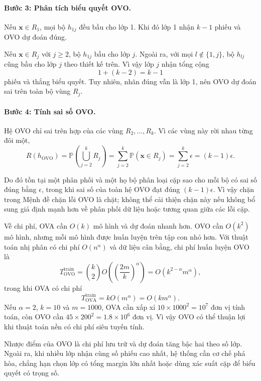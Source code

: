 \begin{expandbox}
\paragraph{Bước 3: Phân tích biểu quyết OVO.}
Nếu $\bm{x}\in R_1$, mọi bộ $h_{1j}$ đều bầu cho lớp 1. Khi đó lớp 1 nhận $k-1$ phiếu và OVO dự đoán đúng.

Nếu $\bm{x}\in R_j$ với $j\geq 2$, bộ $h_{1j}$ bầu cho lớp $j$. Ngoài ra, với mọi $l\notin\{1,j\}$, bộ $h_{lj}$ cũng bầu cho lớp $j$ theo thiết kế trên. Vì vậy lớp $j$ nhận tổng cộng
\[
  1+(k-2)=k-1
\]
phiếu và thắng biểu quyết. Tuy nhiên, nhãn đúng vẫn là lớp 1, nên OVO dự đoán sai trên toàn bộ vùng $R_j$.

\paragraph{Bước 4: Tính sai số OVO.}
Hệ OVO chỉ sai trên hợp của các vùng $R_2,\ldots,R_k$. Vì các vùng này rời nhau từng đôi một,
\[
  R(h_{\text{OVO}})
  =\mathbb{P}\left(\bigcup_{j=2}^{k}R_j\right)
  =\sum_{j=2}^{k}\mathbb{P}(\bm{x}\in R_j)
  =\sum_{j=2}^{k}\epsilon
  =(k-1)\epsilon.
\]

Do đó tồn tại một phân phối và một họ bộ phân loại cặp sao cho mỗi bộ có sai số đúng bằng $\epsilon$, trong khi sai số của toàn hệ OVO đạt đúng $(k-1)\epsilon$. Vì vậy chặn trong Mệnh đề chặn lỗi OVO là chặt; không thể cải thiện chặn này nếu không bổ sung giả định mạnh hơn về phân phối dữ liệu hoặc tương quan giữa các lỗi cặp.
\end{expandbox}

Về chi phí, OVA cần $O(k)$ mô hình và dự đoán nhanh hơn. OVO cần $O(k^2)$ mô hình, nhưng mỗi mô hình được huấn luyện trên tập con nhỏ hơn. Với thuật toán nhị phân có chi phí $O(n^\alpha)$ và dữ liệu cân bằng, chi phí huấn luyện OVO là
\[
  T_{\text{OVO}}^{\text{train}}=\binom{k}{2}O\left(\left(\frac{2m}{k}\right)^\alpha\right)=O(k^{2-\alpha}m^\alpha),
\]
trong khi OVA có chi phí
\[
  T_{\text{OVA}}^{\text{train}}=kO(m^\alpha)=O(km^\alpha).
\]
Nếu $\alpha=2$, $k=10$ và $m=1000$, OVA cần xấp xỉ $10\times1000^2=10^7$ đơn vị tính toán, còn OVO cần $45\times200^2=1.8\times10^6$ đơn vị. Vì vậy OVO có thể thuận lợi khi thuật toán nền có chi phí siêu tuyến tính.

Nhược điểm của OVO là chi phí lưu trữ và dự đoán tăng bậc hai theo số lớp. Ngoài ra, khi nhiều lớp nhận cùng số phiếu cao nhất, hệ thống cần cơ chế phá hòa, chẳng hạn chọn lớp có tổng margin lớn nhất hoặc dùng xác suất cặp để biểu quyết có trọng số.

